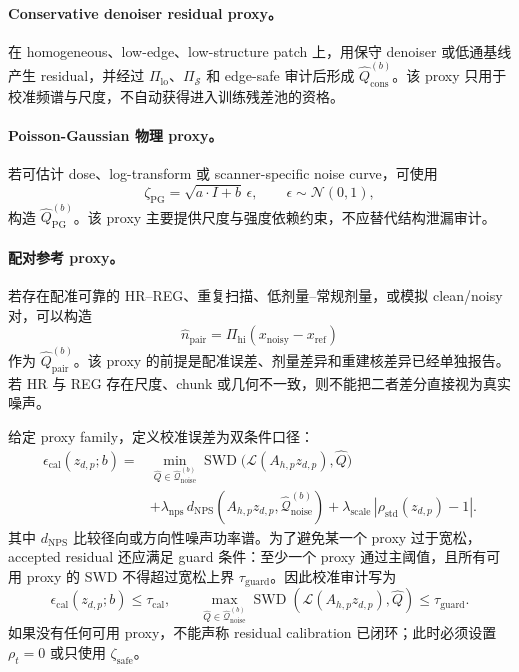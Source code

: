 \documentclass[11pt,a4paper,UTF8,fontset=fandol]{ctexart}
\theoremstyle{definition}
\DeclareMathOperator{\SWD}{SWD}
\newcommand{\abs}[1]{\left\lvert#1\right\rvert}
\begin{document}
\paragraph{Conservative denoiser residual proxy。}
在 homogeneous、low-edge、low-structure patch 上，用保守 denoiser 或低通基线产生 residual，并经过 $\Pi_{\mathrm{lo}}$、$\Pi_{\mathcal S}$ 和 edge-safe 审计后形成 $\widehat Q_{\mathrm{cons}}^{(b)}$。该 proxy 只用于校准频谱与尺度，不自动获得进入训练残差池的资格。

\paragraph{Poisson-Gaussian 物理 proxy。}
若可估计 dose、log-transform 或 scanner-specific noise curve，可使用
\begin{equation}
    \zeta_{\mathrm{PG}}=\sqrt{a\cdot I+b}\,\epsilon,
    \qquad \epsilon\sim\mathcal N(0,1),
\end{equation}
构造 $\widehat Q_{\mathrm{PG}}^{(b)}$。该 proxy 主要提供尺度与强度依赖约束，不应替代结构泄漏审计。

\paragraph{配对参考 proxy。}
若存在配准可靠的 HR--REG、重复扫描、低剂量--常规剂量，\allowbreak 或模拟 clean/noisy 对，可以构造
\begin{equation}
    \widehat n_{\mathrm{pair}}=\Pi_{\mathrm{hi}}(x_{\mathrm{noisy}}-x_{\mathrm{ref}})
\end{equation}
作为 $\widehat Q_{\mathrm{pair}}^{(b)}$。该 proxy 的前提是配准误差、剂量差异和重建核差异已经单独报告。若 HR 与 REG 存在尺度、chunk 或几何不一致，则不能把二者差分直接视为真实噪声。

给定 proxy family，定义校准误差为双条件口径：
\begin{equation}
\label{eq:cal-proxy-error-auditB}
\begin{aligned}
    \epsilon_{\mathrm{cal}}(z_{d,p};b)
    ={}&\min_{\widehat Q\in\widehat{\mathcal Q}_{\mathrm{noise}}^{(b)}}
    \SWD\big(\mathcal L(A_{h,p}z_{d,p}),\widehat Q\big)\nonumber\\
    &+\lambda_{\mathrm{nps}}\,d_{\mathrm{NPS}}(A_{h,p}z_{d,p},\widehat{\mathcal Q}_{\mathrm{noise}}^{(b)})
    +\lambda_{\mathrm{scale}}\,\abs{\rho_{\mathrm{std}}(z_{d,p})-1}.
\end{aligned}
\end{equation}
其中 $d_{\mathrm{NPS}}$ 比较径向或方向性噪声功率谱。为了避免某一个 proxy 过于宽松，accepted residual 还应满足 guard 条件：至少一个 proxy 通过主阈值，且所有可用 proxy 的 SWD 不得超过宽松上界 $\tau_{\mathrm{guard}}$。因此校准审计写为
\begin{equation}
\label{eq:cal-guard-auditB}
    \epsilon_{\mathrm{cal}}(z_{d,p};b)\le\tau_{\mathrm{cal}},
    \qquad
    \max_{\widehat Q\in\widehat{\mathcal Q}_{\mathrm{noise}}^{(b)}}
    \SWD(\mathcal L(A_{h,p}z_{d,p}),\widehat Q)
    \le\tau_{\mathrm{guard}}.
\end{equation}
如果没有任何可用 proxy，不能声称 residual calibration 已闭环；此时必须设置 $\rho_t=0$ 或只使用 $\zeta_{\mathrm{safe}}$。
\end{document}
